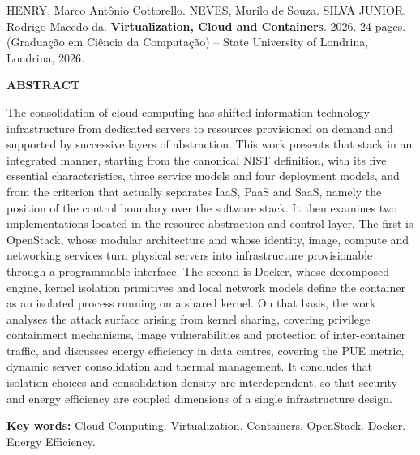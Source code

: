 \noindent HENRY, Marco Antônio Cottorello. NEVES, Murilo de Souza. SILVA JUNIOR, Rodrigo Macedo da.
\textbf{Virtualization, Cloud and Containers}. 2026. 24 pages.
(Graduação em Ciência da Computação) -- State University of Londrina,
Londrina, 2026.

\vspace{2\baselineskip}
\begin{center}
  \textbf{ABSTRACT}
\end{center}

\vspace{\baselineskip}

\noindent The consolidation of cloud computing has shifted information technology infrastructure from dedicated servers to resources provisioned on demand and supported by successive layers of abstraction. This work presents that stack in an integrated manner, starting from the canonical NIST definition, with its five essential characteristics, three service models and four deployment models, and from the criterion that actually separates IaaS, PaaS and SaaS, namely the position of the control boundary over the software stack. It then examines two implementations located in the resource abstraction and control layer. The first is OpenStack, whose modular architecture and whose identity, image, compute and networking services turn physical servers into infrastructure provisionable through a programmable interface. The second is Docker, whose decomposed engine, kernel isolation primitives and local network models define the container as an isolated process running on a shared kernel. On that basis, the work analyses the attack surface arising from kernel sharing, covering privilege containment mechanisms, image vulnerabilities and protection of inter-container traffic, and discusses energy efficiency in data centres, covering the PUE metric, dynamic server consolidation and thermal management. It concludes that isolation choices and consolidation density are interdependent, so that security and energy efficiency are coupled dimensions of a single infrastructure design.

\vfill

\noindent\textbf{Key words:} Cloud Computing. Virtualization. Containers. OpenStack. Docker. Energy Efficiency.
